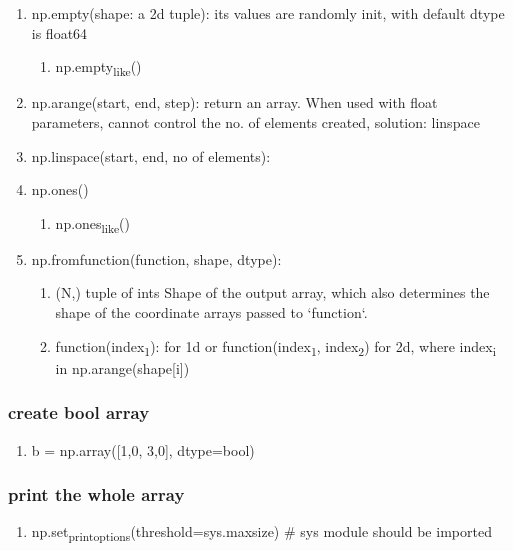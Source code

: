 \documentclass[11pt]{article}
\begin{document}
\begin{enumerate}
\item np.empty(shape: a 2d tuple): its values are randomly init, with default dtype is float64
\label{sec:org8801866}
\begin{enumerate}
\item np.empty\textsubscript{like}()
\label{sec:org30ca2ab}
\end{enumerate}
\item np.arange(start, end, step): return an array. When used with float parameters, cannot control the no. of elements created, solution: linspace
\label{sec:orga29e139}
\item np.linspace(start, end, no of elements):
\label{sec:orge1ea7cc}
\item np.ones()
\label{sec:orgcc3b376}
\begin{enumerate}
\item np.ones\textsubscript{like}()
\label{sec:org04a5a39}
\end{enumerate}
\item np.fromfunction(function, shape, dtype):
\label{sec:org2aede6b}
\begin{enumerate}
\item (N,) tuple of ints Shape of the output array, which also determines the shape of the coordinate arrays passed to `function`.
\label{sec:org2c90c23}
\item function(index\textsubscript{1}): for 1d or function(index\textsubscript{1}, index\textsubscript{2}) for 2d, where index\textsubscript{i} in np.arange(shape[i])
\label{sec:org74c1c42}
\end{enumerate}
\end{enumerate}
\subsubsection{create bool array}
\label{sec:orgc7e747c}
\begin{enumerate}
\item b = np.array([1,0, 3,0], dtype=bool)
\label{sec:orga37f09c}
\end{enumerate}
\subsubsection{print the whole array}
\label{sec:orgb11d58c}
\begin{enumerate}
\item np.set\textsubscript{printoptions}(threshold=sys.maxsize)       \# sys module should be imported
\label{sec:orgca605b3}
\end{enumerate}
\end{document}
